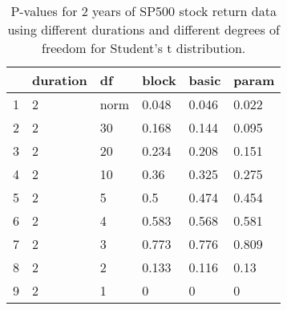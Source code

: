 \begin{table}[ht]
\centering
\caption{P-values for 2 years of SP500 stock return 
                   data using different durations
  and different degrees of freedom for Student's t distribution.} 
\label{table:SP5002}
\begin{tabular}{rlllll}
  \hline
 & duration & df & block & basic & param \\ 
  \hline
1 & 2 & norm & 0.048 & 0.046 & 0.022 \\ 
  2 & 2 & 30 & 0.168 & 0.144 & 0.095 \\ 
  3 & 2 & 20 & 0.234 & 0.208 & 0.151 \\ 
  4 & 2 & 10 & 0.36 & 0.325 & 0.275 \\ 
  5 & 2 & 5 & 0.5 & 0.474 & 0.454 \\ 
  6 & 2 & 4 & 0.583 & 0.568 & 0.581 \\ 
  7 & 2 & 3 & 0.773 & 0.776 & 0.809 \\ 
  8 & 2 & 2 & 0.133 & 0.116 & 0.13 \\ 
  9 & 2 & 1 & 0 & 0 & 0 \\ 
   \hline
\end{tabular}
\end{table}

